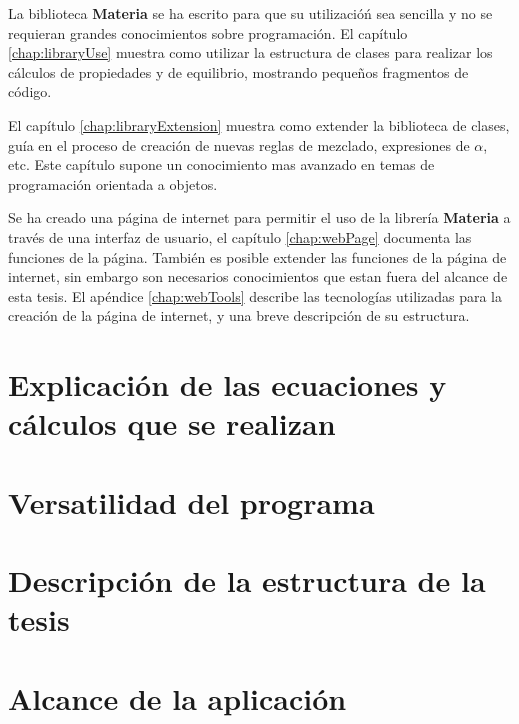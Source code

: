 	La biblioteca \textbf{Materia} se ha escrito para que su utilizacióń sea sencilla y no se requieran grandes conocimientos sobre programación. El capítulo \ref{chap:libraryUse} muestra como utilizar la estructura de clases para realizar los cálculos de propiedades y de equilibrio, mostrando pequeños fragmentos de código.

	El capítulo \ref{chap:libraryExtension} muestra como extender la biblioteca de clases, guía en el proceso de creación de nuevas reglas de mezclado, expresiones de $\alpha$, etc. Este capítulo supone un conocimiento mas avanzado en temas de programación orientada a objetos.

	Se ha creado una página de internet para permitir el uso de la librería \textbf{Materia} a través de una interfaz de usuario, el capítulo \ref{chap:webPage} documenta las funciones de la página. También es posible extender las funciones de la página de internet, sin embargo son necesarios conocimientos que estan fuera del alcance de esta tesis. El apéndice \ref{chap:webTools} describe las tecnologías utilizadas para la creación de la página de internet, y una breve descripción de su estructura.

	\section{Explicación de las ecuaciones y cálculos que se realizan}
	\section{Versatilidad del programa}
	\section{Descripción de la estructura de la tesis}
	\section{Alcance de la aplicación}

